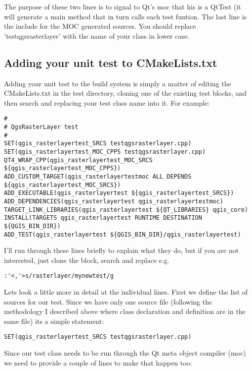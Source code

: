 The purpose of these two lines is to signal to Qt's moc that his is a QtTest
(it will generate a main method that in turn calls each test funtion.  The last
line is the include for the MOC generated sources. You should replace
'testqgsrasterlayer' with the name of your class in lower case.

\subsection{Adding your unit test to CMakeLists.txt}
Adding your unit test to the build system is simply a matter of editing the
CMakeLists.txt in the test directory, cloning one of the existing test blocks,
and then search and replacing your test class name into it.  For example:

\begin{verbatim}
#
# QgsRasterLayer test
#
SET(qgis_rasterlayertest_SRCS testqgsrasterlayer.cpp)
SET(qgis_rasterlayertest_MOC_CPPS testqgsrasterlayer.cpp)
QT4_WRAP_CPP(qgis_rasterlayertest_MOC_SRCS ${qgis_rasterlayertest_MOC_CPPS})
ADD_CUSTOM_TARGET(qgis_rasterlayertestmoc ALL DEPENDS ${qgis_rasterlayertest_MOC_SRCS})
ADD_EXECUTABLE(qgis_rasterlayertest ${qgis_rasterlayertest_SRCS})
ADD_DEPENDENCIES(qgis_rasterlayertest qgis_rasterlayertestmoc)
TARGET_LINK_LIBRARIES(qgis_rasterlayertest ${QT_LIBRARIES} qgis_core)
INSTALL(TARGETS qgis_rasterlayertest RUNTIME DESTINATION ${QGIS_BIN_DIR})
ADD_TEST(qgis_rasterlayertest ${QGIS_BIN_DIR}/qgis_rasterlayertest)
\end{verbatim}

I'll run through these lines briefly to explain what they do, but if you are
not interested, just clone the block, search and replace e.g.

\begin{verbatim}
:'<,'>s/rasterlayer/mynewtest/g
\end{verbatim}

Lets look a little more in detail at the individual lines. First we define the
list of sources for our test. Since we have only one source file (following the
methodology I described above where class declaration and definition are in the
same file) its a simple statement:

\begin{verbatim}
SET(qgis_rasterlayertest_SRCS testqgsrasterlayer.cpp)
\end{verbatim}

Since our test class needs to be run through the Qt meta object compiler (moc)
we need to provide a couple of lines to make that happen too:

